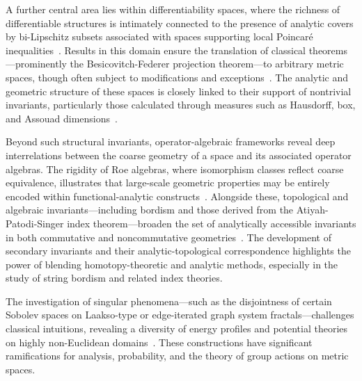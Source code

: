 \documentclass[sigconf]{acmart}
\begin{document}
A further central area lies within differentiability spaces, where the richness of differentiable structures is intimately connected to the presence of analytic covers by bi-Lipschitz subsets associated with spaces supporting local Poincaré inequalities~\cite{ref6,ref93}. Results in this domain ensure the translation of classical theorems—prominently the Besicovitch-Federer projection theorem—to arbitrary metric spaces, though often subject to modifications and exceptions~\cite{ref11}. The analytic and geometric structure of these spaces is closely linked to their support of nontrivial invariants, particularly those calculated through measures such as Hausdorff, box, and Assouad dimensions~\cite{ref2,ref3,ref21,ref27,ref39,ref43,ref52}.

Beyond such structural invariants, operator-algebraic frameworks reveal deep interrelations between the coarse geometry of a space and its associated operator algebras. The rigidity of Roe algebras, where isomorphism classes reflect coarse equivalence, illustrates that large-scale geometric properties may be entirely encoded within functional-analytic constructs~\cite{ref14}. Alongside these, topological and algebraic invariants—including bordism and those derived from the Atiyah-Patodi-Singer index theorem—broaden the set of analytically accessible invariants in both commutative and noncommutative geometries~\cite{ref82}. The development of secondary invariants and their analytic-topological correspondence highlights the power of blending homotopy-theoretic and analytic methods, especially in the study of string bordism and related index theories.

The investigation of singular phenomena—such as the disjointness of certain Sobolev spaces on Laakso-type or edge-iterated graph system fractals—challenges classical intuitions, revealing a diversity of energy profiles and potential theories on highly non-Euclidean domains~\cite{ref30,ref35}. These constructions have significant ramifications for analysis, probability, and the theory of group actions on metric spaces.
\end{document}
